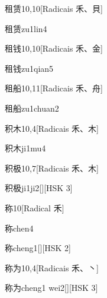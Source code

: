 \begin{entry}{租赁}{10,10}[Radicais ⽲、⾙]
  \begin{phonetics}{租赁}{zu1lin4}
  \end{phonetics}
\end{entry}

\begin{entry}{租钱}{10,10}[Radicais ⽲、⾦]
  \begin{phonetics}{租钱}{zu1qian5}
  \end{phonetics}
\end{entry}

\begin{entry}{租船}{10,11}[Radicais ⽲、⾈]
  \begin{phonetics}{租船}{zu1chuan2}
  \end{phonetics}
\end{entry}

\begin{entry}{积木}{10,4}[Radicais ⽲、⽊]
  \begin{phonetics}{积木}{ji1mu4}
  \end{phonetics}
\end{entry}

\begin{entry}{积极}{10,7}[Radicais ⽲、⽊]
  \begin{phonetics}{积极}{ji1ji2}[][HSK 3]
  \end{phonetics}
\end{entry}

\begin{entry}{称}{10}[Radical ⽲]
  \begin{phonetics}{称}{chen4}
  \end{phonetics}
  \begin{phonetics}{称}{cheng1}[][HSK 2]
  \end{phonetics}
\end{entry}

\begin{entry}{称为}{10,4}[Radicais ⽲、⼂]
  \begin{phonetics}{称为}{cheng1 wei2}[][HSK 3]
  \end{phonetics}
\end{entry}

